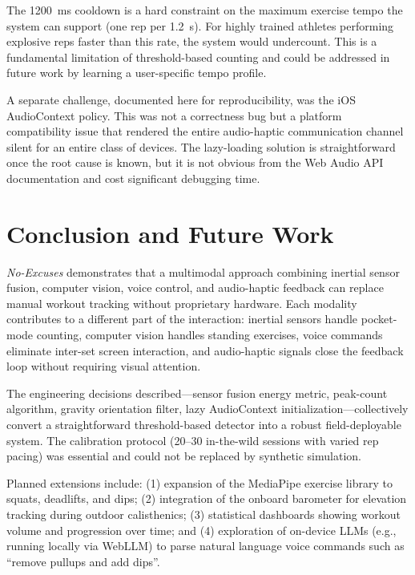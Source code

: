 \documentclass[11pt]{article}
\newcommand{\minisection}[1]{\noindent{\textbf{#1.}}}
\begin{document}
The 1200~ms cooldown is a hard constraint on the maximum exercise tempo the system can support (one rep per 1.2~s). For highly trained athletes performing explosive reps faster than this rate, the system would undercount. This is a fundamental limitation of threshold-based counting and could be addressed in future work by learning a user-specific tempo profile.

A separate challenge, documented here for reproducibility, was the iOS AudioContext policy. This was not a correctness bug but a platform compatibility issue that rendered the entire audio-haptic communication channel silent for an entire class of devices. The lazy-loading solution is straightforward once the root cause is known, but it is not obvious from the Web Audio API documentation and cost significant debugging time.

\section{Conclusion and Future Work}

\textit{No-Excuses} demonstrates that a multimodal approach combining inertial sensor fusion, computer vision, voice control, and audio-haptic feedback can replace manual workout tracking without proprietary hardware. Each modality contributes to a different part of the interaction: inertial sensors handle pocket-mode counting, computer vision handles standing exercises, voice commands eliminate inter-set screen interaction, and audio-haptic signals close the feedback loop without requiring visual attention.

The engineering decisions described—sensor fusion energy metric, peak-count algorithm, gravity orientation filter, lazy AudioContext initialization—collectively convert a straightforward threshold-based detector into a robust field-deployable system. The calibration protocol (20--30 in-the-wild sessions with varied rep pacing) was essential and could not be replaced by synthetic simulation.

\minisection{Future Work}
Planned extensions include: (1) expansion of the MediaPipe exercise library to squats, deadlifts, and dips; (2) integration of the onboard barometer for elevation tracking during outdoor calisthenics; (3) statistical dashboards showing workout volume and progression over time; and (4) exploration of on-device LLMs (e.g., running locally via WebLLM) to parse natural language voice commands such as ``remove pullups and add dips''.
\end{document}
